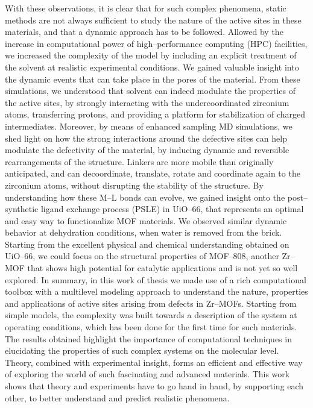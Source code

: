 With these observations, it is clear that for such complex phenomena, static methods are not always sufficient to study the nature of the active sites in these materials, and that a dynamic approach has to be followed. Allowed by the increase in computational power of high--performance computing (HPC) facilities, we increased the complexity of the model by including an explicit treatment of the solvent at realistic experimental conditions. We gained valuable insight into the dynamic events that can take place in the pores of the material. From these simulations, we understood that solvent can indeed modulate the properties of the active sites, by strongly interacting with the undercoordinated zirconium atoms, transferring protons, and providing a platform for stabilization of charged intermediates. Moreover, by means of enhanced sampling MD simulations, we shed light on how the strong interactions around the defective sites can help modulate the defectivity of the material, by inducing dynamic and reversible rearrangements of the structure. Linkers are more mobile than originally anticipated, and can decoordinate, translate, rotate and coordinate again to the zirconium atoms, without disrupting the stability of the structure. By understanding how these M--L bonds can evolve, we gained insight onto the post--synthetic ligand exchange process (PSLE) in UiO--66, that represents an optimal and easy way to functionalize MOF materials. We observed similar dynamic behavior at dehydration conditions, when water is removed from the brick. Starting from the excellent physical and chemical understanding obtained on UiO--66, we could focus on the structural properties of MOF--808, another Zr--MOF that shows high potential for catalytic applications and is not yet so well explored. 
\npar
In summary, in this work of thesis we made use of a rich computational toolbox with a multilevel modeling approach to understand the nature, properties and applications of active sites arising from defects in Zr--MOFs. Starting from simple models, the complexity was built towards a description of the system at operating conditions, which has been done for the first time for such materials. The results obtained highlight the importance of computational techniques in elucidating the properties of such complex systems on the molecular level. Theory, combined with experimental insight, forms an efficient and effective way of exploring the world of such fascinating and advanced materials. This work shows that theory and experiments have to go hand in hand, by supporting each other, to better understand and predict realistic phenomena.

